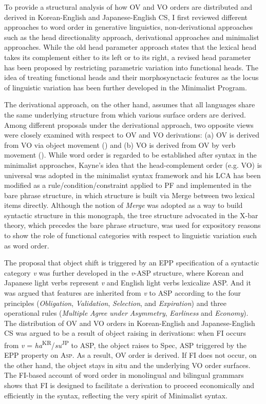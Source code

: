To provide a structural analysis of how \ac{OV} and \ac{VO} orders are distributed and derived in Korean-English and Japanese-English \ac{CS}, I first reviewed different approaches to word order in generative linguistics, non-derivational approaches such as the head directionality approach, derivational approaches and minimalist approaches. While the old head parameter approach states that the lexical head takes its complement either to its left or to its right, a revised head parameter has been proposed by restricting parametric variation into functional heads. The idea of treating functional heads and their morphosynctacic features as the locus of linguistic variation has been further developed in the Minimalist Program. 

The derivational approach, on the other hand, assumes that all languages share the same underlying structure from which various surface orders are derived. Among different proposals under the derivational approach, two opposite views were closely examined with respect to \ac{OV} and \ac{VO} derivations: (a) \ac{OV} is derived from \ac{VO} via object movement (\citealt{Kayne1994}) and (b) \ac{VO} is derived from \ac{OV} by verb movement (\citealt{Haider1992,Haider2000}). While word order is regarded to be established after syntax in the minimalist approaches, Kayne’s idea that the head-complement order (e.g. \ac{VO}) is universal was adopted in the minimalist syntax framework and his \acf{LCA} has been modified as a rule/condition/constraint applied to \ac{PF} and implemented in the bare phrase structure, in which structure is built via Merge between two lexical items directly. Although the notion of \textit{Merge} was adopted as a way to build syntactic structure in this monograph, the tree structure advocated in the X-bar theory, which precedes the bare phrase structure, was used for expository reasons to show the role of functional categories with respect to linguistic variation such as word order. 

The proposal that object shift is triggered by an \ac{EPP} specification of a syntactic category \textit{v} was further developed in the \textit{v}{}-\ac{ASP} structure, where Korean and Japanese light verbs represent \textit{v} and English light verbs lexicalize \ac{ASP}. And it was argued that features are inherited from \textit{v} to \ac{ASP} according to the four principles (\textit{Obligation}, \textit{Validation}, \textit{Selection}, and \textit{Expiration}) and three operational rules (\textit{Multiple} \textit{Agree} \textit{under} \textit{Asymmetry}, \textit{Earliness} and \textit{Economy}). The distribution of \ac{OV} and \ac{VO} orders in Korean-English and Japanese-English \ac{CS} was argued to be a result of object raising in derivations: when \ac{FI} occurs from \textit{v} = \textit{ha}\textsuperscript{KR}/\textit{su}\textsuperscript{JP} to \ac{ASP}, the object raises to Spec, \ac{ASP} triggered by the \ac{EPP} property on A\textsc{sp.} As a result, \ac{OV} order is derived. If \ac{FI} does not occur, on the other hand, the object stays in situ and the underlying \ac{VO} order surfaces. The \ac{FI}-based account of word order in monolingual and bilingual grammars shows that \ac{FI} is designed to facilitate a derivation to proceed economically and efficiently in the syntax, reflecting the very spirit of Minimalist syntax.
